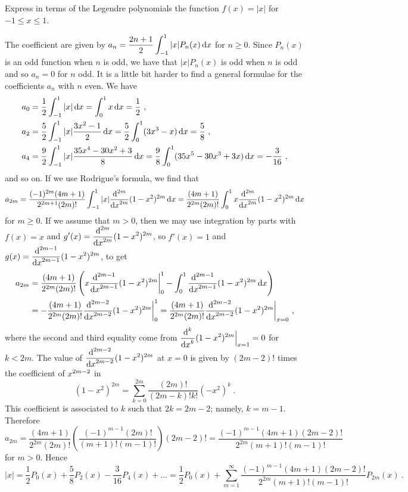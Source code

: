 \begin{egg}
Express in terms of the Legendre polynomials the function
$f(x) = |x|$ for $-1\leq x \leq 1$.

The coefficient are given by
$\DS a_n  =  \frac{2n+1}{2} \int_{-1}^{1} |x| P_n(x)\dx{x}$
for $n \geq 0$.  Since $P_n(x)$ is an odd function when $n$ is odd, we
have that $|x| P_n(x)$ is odd when $n$ is odd and so $a_n =0$ for $n$
odd.  It is a little bit harder to find a general formulae for the
coefficients $a_n$ with $n$ even.  We have
\begin{align*}
a_0 &= \frac{1}{2} \int_{-1}^1 |x| \dx{x} = \int_0^1 x \dx{x} =
\frac{1}{2} \ ,\\
a_2 &= \frac{5}{2} \int_{-1}^1 |x| \frac{3x^2-1}{2} \dx{x} 
= \frac{5}{2} \int_0^1 (3x^3-x) \dx{x} = \frac{5}{8} \ , \\
a_4 &= \frac{9}{2} \int_{-1}^1 |x| \frac{35x^4-30x^2+3}{8} \dx{x}
= \frac{9}{8} \int_0^1 (35x^5-30x^3+3x) \dx{x} = -\frac{3}{16} \ ,
\end{align*}
and so on.  If we use Rodrigue's formula, we find that
\[
a_{2m} = \frac{(-1)^{2m}(4m+1)}{2^{2m+1} (2m)!}
\int_{-1}^{1} |x| \dfdxn{(1-x^2)^{2m}}{x}{2m} \dx{x}
= \frac{(4m+1)}{2^{2m} (2m)!} \int_0^{1} x \dfdxn{(1-x^2)^{2m}}{x}{2m} \dx{x}
\]
for $m \ge 0$.  If we assume that $m>0$, then we may use integration by
parts with $f(x) = x$ and
$\DS g'(x) = \dfdxn{(1-x^2)^{2m}}{x}{2m}$, so 
$f'(x) = 1$ and $\DS g(x) = \dfdxn{(1-x^2)^{2m}}{x}{2m-1}$, to
get
\begin{align*}
a_{2m} &= \frac{(4m+1)}{2^{2m} (2m)!}\left(
x \dfdxn{(1-x^2)^{2m}}{x}{2m-1}\bigg|_0^1 
- \int_0^{1} \dfdxn{(1-x^2)^{2m}}{x}{2m-1} \dx{x}\right)\\
&= - \frac{(4m+1)}{2^{2m} (2m)!} \dfdxn{(1-x^2)^{2m}}{x}{2m-2}\bigg|_0^1
= \frac{(4m+1)}{2^{2m} (2m)!} \dfdxn{(1-x^2)^{2m}}{x}{2m-2}\bigg|_{x=0} \ ,
\end{align*}
where the second and third equality come from
$\DS \dfdxn{(1-x^2)^{2m}}{x}{k}\Big|_{x=1} = 0$ for $k<2m$.
The value of $\DS \dfdxn{(1-x^2)^{2m}}{x}{2m-2}$ at $x=0$ is
given by $(2m-2)!$ times the coefficient of $\DS x^{2m-2}$ in
\[
(1-x^2)^{2m} = \sum_{k=0}^{2m} \frac{(2m)!}{(2m-k)!k!} (-x^2)^k \ .
\]
This coefficient is associated to $k$ such that $2k = 2m-2$; namely,
$k=m-1$.  Therefore
\[
a_{2m} = \frac{(4m+1)}{2^{2m} (2m)!}\left(
 \frac{(-1)^{m-1}  (2m)!}{(m+1)!(m-1)!} \right) (2m-2)!
= \frac{(-1)^{m-1} (4m+1) (2m-2)!}{2^{2m}(m+1)!(m-1)!}
\]
for $m>0$.  Hence
\[
|x| = \frac{1}{2}P_0(x) + \frac{5}{8}P_2(x) - \frac{3}{16}P_4(x) + \ldots
= \frac{1}{2}P_0(x) + \sum_{m=1}^\infty
\frac{(-1)^{m-1} (4m+1) (2m-2)!}{2^{2m}(m+1)!(m-1)!} P_{2m}(x) \ .
\]
\end{egg}


